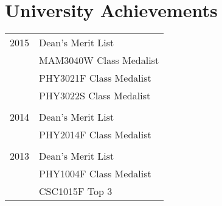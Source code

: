 
\section{University Achievements}

\begin{tabular}{R{1cm}|l}
2015 & Dean's Merit List\\
 & MAM3040W Class Medalist\\
 & PHY3021F Class Medalist\\
 & PHY3022S Class Medalist\\
&\\
2014 & Dean's Merit List\\
 & PHY2014F Class Medalist\\
&\\
2013 & Dean's Merit List\\
&PHY1004F Class Medalist\\
&CSC1015F Top 3\\
\end{tabular}


